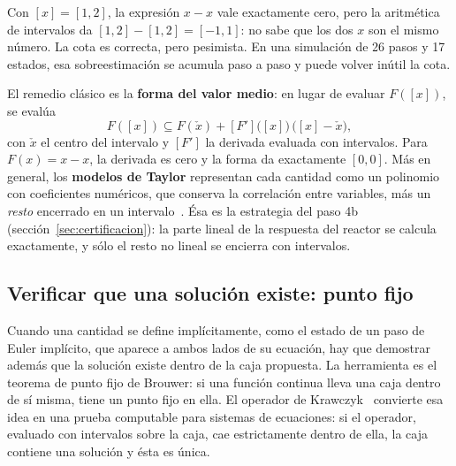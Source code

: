 \begin{ejemplo}
Con $[x]=[1,2]$, la expresión $x-x$ vale exactamente cero, pero la aritmética de intervalos da
$[1,2]-[1,2]=[-1,1]$: no sabe que los dos $x$ son el mismo número. La cota es correcta, pero
pesimista. En una simulación de 26 pasos y 17 estados, esa sobreestimación se acumula paso a
paso y puede volver inútil la cota.
\end{ejemplo}
\noindent El remedio clásico es la \textbf{forma del valor medio}: en lugar de evaluar $F([x])$,
se evalúa
\[
F([x])\subseteq F(\check x)+[F']\big([x]\big)\,\big([x]-\check x\big),
\]
con $\check x$ el centro del intervalo y $[F']$ la derivada evaluada con intervalos. Para $F(x)=x-x$,
la derivada es cero y la forma da exactamente $[0,0]$. Más en general, los \textbf{modelos de
Taylor} representan cada cantidad como un polinomio con coeficientes numéricos, que conserva la
correlación entre variables, más un \emph{resto} encerrado en un intervalo~\cite{makino2003}.
Ésa es la estrategia del paso 4b (sección~\ref{sec:certificacion}): la parte lineal de la
respuesta del reactor se calcula exactamente, y sólo el resto no lineal se encierra con
intervalos.

\subsection{Verificar que una solución existe: punto fijo}
Cuando una cantidad se define implícitamente, como el estado de un paso de Euler implícito, que
aparece a ambos lados de su ecuación, hay que demostrar además que la solución existe dentro de
la caja propuesta. La herramienta es el teorema de punto fijo de Brouwer: si una función
continua lleva una caja dentro de sí misma, tiene un punto fijo en ella. El operador de
Krawczyk~\cite{krawczyk1969} convierte esa idea en una prueba computable para sistemas de
ecuaciones: si el operador, evaluado con intervalos sobre la caja, cae estrictamente dentro de
ella, la caja contiene una solución y ésta es única.

